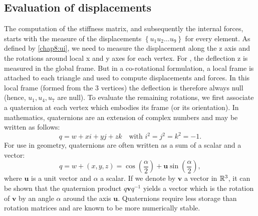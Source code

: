 	\subsection{Evaluation of displacements}
The computation of the stiffness matrix, and subsequently the internal forces, starts with the measure of the displacements $\left\{u_1 u_2 \ldots u_9 \right\} $ for every element. As defined by \eqref{chap8:ui}, we need to measure the displacement along the z axis and the rotations around local x and y axes for each vertex. For \cite{Przemieniecki85}, the deflection z is measured in the global frame. But in a co-rotational formulation, a local frame is attached to each triangle and used to compute displacements and forces. In this local frame (formed from the 3 vertices) the deflection is therefore always null (hence, $ u_1, u_4, u_7 $ are null). To evaluate the remaining rotations, we first associate a quaternion at each vertex which embodies its frame (or its orientation). In mathematics, quaternions are an extension of complex numbers and may be written as follows:
\begin{equation}
q = w + x i + y j + z k \quad \mbox{with } i^2 = j^2 = k^2 = -1.
\end{equation}
For use in geometry, quaternions are often written as a sum of a scalar and a vector:
\begin{equation}
q = w + (x, y, z) = \cos (\frac{\alpha}{2}) + \mathbf{u} \sin (\frac{\alpha}{2}),
\end{equation}
where $ \mathbf{u} $ is a unit vector and $ \alpha $ a scalar. If we denote by $ \mathbf{v} $ a vector in $\mathbb{R}^3$, it can be shown that the quaternion product $ q \mathbf{v} q^{-1} $ yields a vector which is the rotation of $ \mathbf{v} $ by an angle $ \alpha $ around the axis $ \mathbf{u} $. Quaternions require less storage than rotation matrices and are known to be more numerically stable. 

